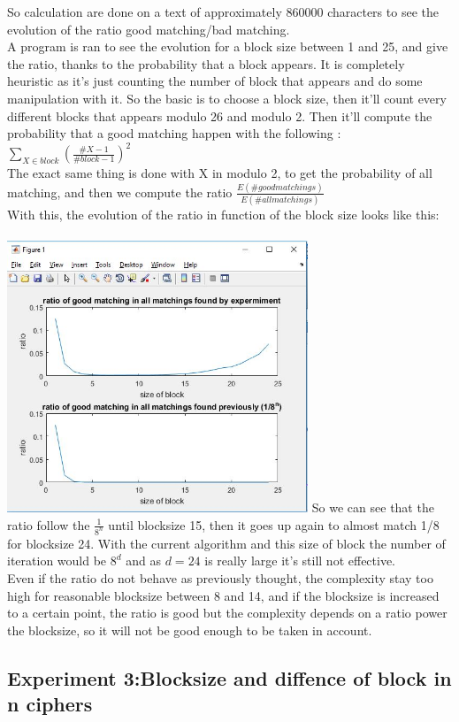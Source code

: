 \documentclass{article}
\begin{document}
So calculation are done on a text of approximately $860000$ characters to see the evolution of the ratio good matching/bad matching.\\
A program is ran to see the evolution for a block size between 1 and 25, and give the ratio, thanks to the probability that a block appears. It is completely heuristic as it's just counting the number of block that appears and do some manipulation with it.
So the basic is to choose a block size, then it'll count every different blocks that appears modulo 26 and modulo 2.
Then it'll compute the probability that a good matching happen with the following : $\sum_{X \in block}({\frac{\#X -1}{\#block -1}})^2 $\\
The exact same thing is done with X in modulo 2, to get the probability of all matching, and then we compute the ratio $\frac{E(\# good matchings)}{E(\# all matchings)}$\\
With this, the evolution of the ratio in function of the block size looks like this:\\
\\
\includegraphics[width=90mm]{ratio.jpg}
So we can see that the ratio follow the $\frac{1}{8^n}$ until blocksize 15, then it goes up again to almost match 1/8 for blocksize 24. With the current algorithm and this size of block the number of iteration would be $8^d$ and as $d = 24$ is really large it's still not effective.\\
Even if the ratio do not behave as previously thought, the complexity stay too high for reasonable blocksize between 8 and 14, and if the blocksize is increased to a certain point, the ratio is good but the complexity depends on a ratio power the blocksize, so it will not be good enough to be taken in account.

\subsection{Experiment 3:Blocksize and diffence of block in n ciphers}
\end{document}
